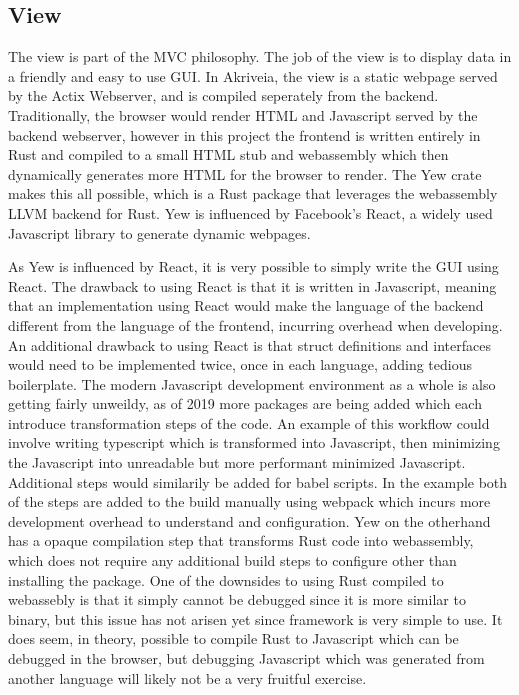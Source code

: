 \subsection{View}
\label{view_section}
The view is part of the MVC philosophy.
The job of the view is to display data in a friendly and easy to use GUI.
In Akriveia, the view is a static webpage served by the Actix Webserver, and is compiled seperately from the backend.
Traditionally, the browser would render HTML and Javascript served by the backend webserver, however in this project the frontend is written entirely in Rust and compiled to a small HTML stub and webassembly which then dynamically generates more HTML for the browser to render.
The Yew crate makes this all possible, which is a Rust package that leverages the webassembly LLVM backend for Rust.
Yew is influenced by Facebook's React, a widely used Javascript library to generate dynamic webpages.

\bigskip
As Yew is influenced by React, it is very possible to simply write the GUI using React.
The drawback to using React is that it is written in Javascript, meaning that an implementation using React would make the language of the backend different from the language of the frontend, incurring overhead when developing.
An additional drawback to using React is that struct definitions and interfaces would need to be implemented twice, once in each language, adding tedious boilerplate.
The modern Javascript development environment as a whole is also getting fairly unweildy, as of 2019 more packages are being added which each introduce transformation steps of the code.
An example of this workflow could involve writing typescript which is transformed into Javascript, then minimizing the Javascript into unreadable but more performant minimized Javascript.
Additional steps would similarily be added for babel scripts.
In the example both of the steps are added to the build manually using webpack which incurs more development overhead to understand and configuration.
Yew on the otherhand has a opaque compilation step that transforms Rust code into webassembly, which does not require any additional build steps to configure other than installing the package.
One of the downsides to using Rust compiled to webassebly is that it simply cannot be debugged since it is more similar to binary, but this issue has not arisen yet since framework is very simple to use.
It does seem, in theory, possible to compile Rust to Javascript which can be debugged in the browser, but debugging Javascript which was generated from another language will likely not be a very fruitful exercise.

